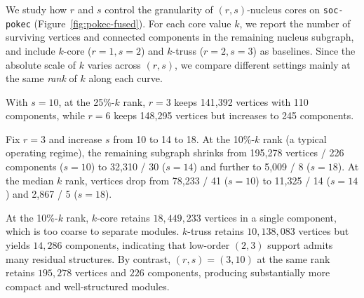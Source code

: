 

\label{sec:case-study-pokec}
We study how $r$ and $s$ control the granularity of $(r,s)$-nucleus cores on \texttt{soc-pokec} (Figure~\ref{fig:pokec-fused}).
For each core value $k$, we report the number of surviving vertices and connected components in the remaining nucleus subgraph, and include $k$-core ($r{=}1, s{=}2$) and $k$-truss ($r{=}2, s{=}3$) as baselines.
Since the absolute scale of $k$ varies across $(r,s)$, we compare different settings mainly at the same \emph{rank} of $k$ along each curve.

With $s{=}10$, at the 25\%-$k$ rank, $r{=}3$ keeps 141{,}392 vertices with 110 components, while $r{=}6$ keeps 148{,}295 vertices but increases to 245 components.

Fix $r{=}3$ and increase $s$ from 10 to 14 to 18.
At the 10\%-$k$ rank (a typical operating regime), the remaining subgraph shrinks from
195{,}278 vertices / 226 components ($s{=}10$) to
32{,}310 / 30 ($s{=}14$) and further to
5{,}009 / 8 ($s{=}18$).
At the median $k$ rank, vertices drop from
78{,}233 / 41 ($s{=}10$) to
11{,}325 / 14 ($s{=}14$) and
2{,}867 / 5 ($s{=}18$).

At the 10\%-$k$ rank, $k$-core retains $18{,}449{,}233$ vertices in a single component, which is too coarse to separate modules.
$k$-truss retains $10{,}138{,}083$ vertices but yields $14{,}286$ components, indicating that low-order $(2,3)$ support admits many residual structures.
By contrast, $(r,s)=(3,10)$ at the same rank retains $195{,}278$ vertices and $226$ components, producing substantially more compact and well-structured modules.


